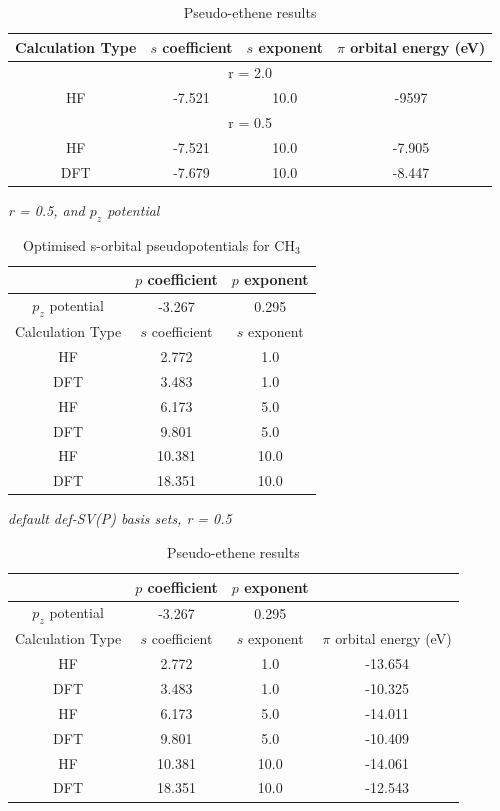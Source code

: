 \documentclass[journal=jctcce,manuscript=article]{achemso}
\begin{document}
\begin{table}[ht]
\caption{Pseudo-ethene results}
\begin{tabular}{c c c c}
\hline\hline
Calculation Type & \(s\) coefficient & \(s\) exponent & \( \pi \) orbital energy (eV) \\
\hline
\multicolumn{4}{c}{r = 2.0} \\
\hline
HF & -7.521 & 10.0 & -9597 \\
\hline
\multicolumn{4}{c}{r = 0.5} \\
\hline
HF & -7.521 & 10.0 & -7.905 \\
DFT & -7.679 & 10.0 & -8.447 \\
\hline
\end{tabular}
\end{table}

\begin{table}[ht]
\caption{Optimised s-orbital pseudopotentials for CH\(_{3}\)}
\textit{r = 0.5, and \(p_{z}\) potential}
\begin{tabular}{c c c}
\hline\hline
& \(p\) coefficient & \(p\) exponent \\
\hline
\(p_{z}\) potential & -3.267 & 0.295 \\
\hline
Calculation Type & \(s\) coefficient & \(s\) exponent \\
\hline
HF & 2.772 & 1.0 \\
DFT & 3.483 & 1.0 \\
HF & 6.173 & 5.0 \\
DFT & 9.801 & 5.0 \\
HF & 10.381 & 10.0 \\
DFT & 18.351 & 10.0 \\
\hline
\end{tabular}
\end{table}

\begin{table}[ht]
\caption{Pseudo-ethene results}
\textit{default def-SV(P) basis sets, r = 0.5}
\begin{tabular}{c c c c}
\hline\hline
& \(p\) coefficient & \(p\) exponent \\
\hline
\(p_{z}\) potential & -3.267 & 0.295 \\
\hline
Calculation Type & \(s\) coefficient & \(s\) exponent & \(\pi\) orbital energy (eV) \\
\hline
HF & 2.772 & 1.0 & -13.654 \\
DFT & 3.483 & 1.0 & -10.325 \\
HF & 6.173 & 5.0 & -14.011 \\
DFT & 9.801 & 5.0 & -10.409 \\
HF & 10.381 & 10.0 & -14.061 \\
DFT & 18.351 & 10.0 & -12.543 \\
\hline
\end{tabular}
\end{table}
\end{document}
